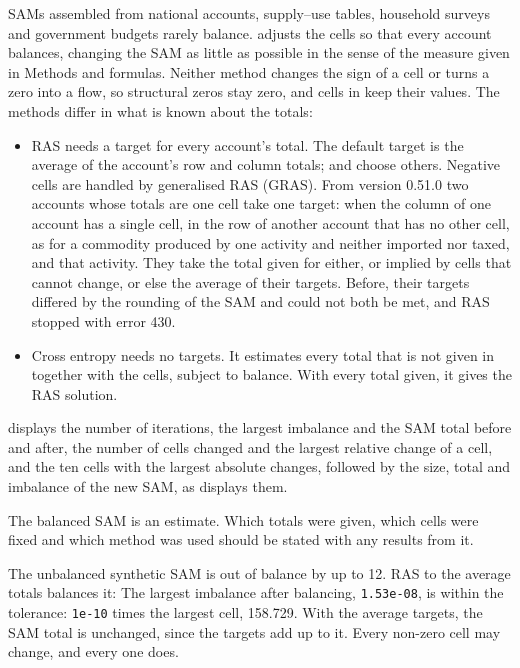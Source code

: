 SAMs assembled from national accounts, supply--use tables, household surveys
and government budgets rarely balance.  adjusts the cells so
that every account balances, changing the SAM as little as possible in the
sense of the measure given in Methods and formulas. Neither method changes the
sign of a cell or turns a zero into a flow, so structural zeros stay zero, and
cells in  keep their values. The methods differ in what is known
about the totals:
\begin{itemize}
\item RAS needs a target for every account's total. The default target is the
average of the account's row and column totals;  and
 choose others. Negative cells are handled by generalised RAS
(GRAS). From version 0.51.0 two accounts whose totals are one cell take one
target: when the column of one account has a single cell, in the row of
another account that has no other cell, as for a commodity produced by one
activity and neither imported nor taxed, and that activity. They take the
total given for either, or implied by cells that cannot change, or else the
average of their targets. Before, their targets differed by the rounding of
the SAM and could not both be met, and RAS stopped with error 430.
\item Cross entropy needs no targets. It estimates every total that is not
given in  together with the cells, subject to balance. With
every total given, it gives the RAS solution.
\end{itemize}
 displays the number of iterations, the largest imbalance and
the SAM total before and after, the number of cells changed and the largest
relative change of a cell, and the ten cells with the largest absolute changes,
followed by the size, total and imbalance of the new SAM, as 
displays them.

The balanced SAM is an estimate. Which totals were given, which cells were
fixed and which method was used should be stated with any results from it.


The unbalanced synthetic SAM is out of balance by up to 12. RAS to the average
totals balances it:
The largest imbalance after balancing, \texttt{1.53e-08}, is within the
tolerance: \texttt{1e-10} times the largest cell, 158.729. With the average
targets, the SAM total is unchanged, since the targets add up to it. Every
non-zero cell may change, and every one does.

